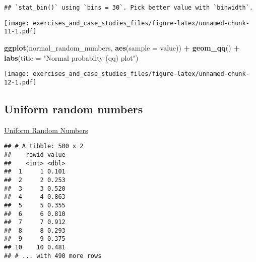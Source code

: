 \documentclass[]{book}
\newenvironment{Shaded}{\begin{snugshade}}{\end{snugshade}}
\newcommand{\DataTypeTok}[1]{\textcolor[rgb]{0.13,0.29,0.53}{#1}}
\newcommand{\DecValTok}[1]{\textcolor[rgb]{0.00,0.00,0.81}{#1}}
\newcommand{\KeywordTok}[1]{\textcolor[rgb]{0.13,0.29,0.53}{\textbf{#1}}}
\newcommand{\NormalTok}[1]{#1}
\newcommand{\OperatorTok}[1]{\textcolor[rgb]{0.81,0.36,0.00}{\textbf{#1}}}
\newcommand{\StringTok}[1]{\textcolor[rgb]{0.31,0.60,0.02}{#1}}
\theoremstyle{definition}
\theoremstyle{definition}
\theoremstyle{definition}
\theoremstyle{remark}
\begin{document}
\begin{verbatim}
## `stat_bin()` using `bins = 30`. Pick better value with `binwidth`.
\end{verbatim}

\texttt{[image: exercises\_and\_case\_studies\_files/figure-latex/unnamed-chunk-11-1.pdf]}

\begin{Shaded}
\begin{Highlighting}[]
\KeywordTok{ggplot}\NormalTok{(normal_random_numbers, }\KeywordTok{aes}\NormalTok{(}\DataTypeTok{sample =}\NormalTok{ value)) }\OperatorTok{+}
\StringTok{  }\KeywordTok{geom_qq}\NormalTok{() }\OperatorTok{+}
\StringTok{  }\KeywordTok{labs}\NormalTok{(}\DataTypeTok{title =} \StringTok{"Normal probabilty (qq) plot"}\NormalTok{)}
\end{Highlighting}
\end{Shaded}

\texttt{[image: exercises\_and\_case\_studies\_files/figure-latex/unnamed-chunk-12-1.pdf]}

\hypertarget{uniform-random-numbers}{%
\subsection{Uniform random numbers}\label{uniform-random-numbers}}

\href{https://www.itl.nist.gov/div898/handbook/eda/section4/eda422.htm}{Uniform
Random Numbers}

\begin{Shaded}
\end{Shaded}

\begin{verbatim}
## # A tibble: 500 x 2
##    rowid value
##    <int> <dbl>
##  1     1 0.101
##  2     2 0.253
##  3     3 0.520
##  4     4 0.863
##  5     5 0.355
##  6     6 0.810
##  7     7 0.912
##  8     8 0.293
##  9     9 0.375
## 10    10 0.481
## # ... with 490 more rows
\end{verbatim}
\end{document}
